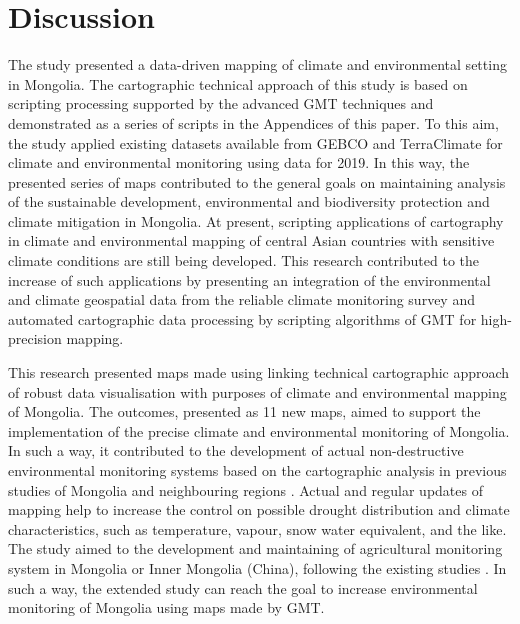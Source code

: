 \documentclass[geosciences,article,submit,pdftex,moreauthors]{Definitions/mdpi}
\begin{document}
\section{Discussion}
The study presented a data-driven mapping of climate and environmental setting in Mongolia. The cartographic technical approach of this study is based on scripting processing supported by the advanced GMT techniques and demonstrated as a series of scripts in the Appendices of this paper. To this aim, the study applied existing datasets available from GEBCO and TerraClimate for climate and environmental monitoring using data for 2019. In this way, the presented series of maps contributed to the general goals on maintaining analysis of the sustainable development, environmental and biodiversity protection and climate mitigation in Mongolia. At present, scripting applications of cartography in climate and environmental mapping of central Asian countries with sensitive climate conditions are still being developed. This research contributed to the increase of such applications by presenting an integration of the environmental and climate geospatial data from the reliable climate monitoring survey and automated cartographic data processing by scripting algorithms of GMT for high-precision mapping. 

This research presented maps made using linking technical cartographic approach of robust data visualisation with purposes of climate and environmental mapping of Mongolia. The outcomes, presented as 11 new maps, aimed to support the implementation of the precise climate and environmental monitoring of Mongolia. In such a way, it contributed to the development of actual non-destructive environmental monitoring systems based on the cartographic analysis in previous studies of Mongolia and neighbouring regions \cite{MENG2021107908,DASHPUREV2021108331,SAINNEMEKH2022104654,Batunacun}. Actual and regular updates of mapping help to increase the control on possible drought distribution and climate characteristics, such as temperature, vapour, snow water equivalent, and the like. The study aimed to the development and maintaining of agricultural monitoring system in Mongolia or Inner Mongolia (China), following the existing studies \cite{Rina,Long,Zheng}. In such a way, the extended study can reach the goal to increase environmental monitoring of Mongolia using maps made by GMT.
\end{document}
